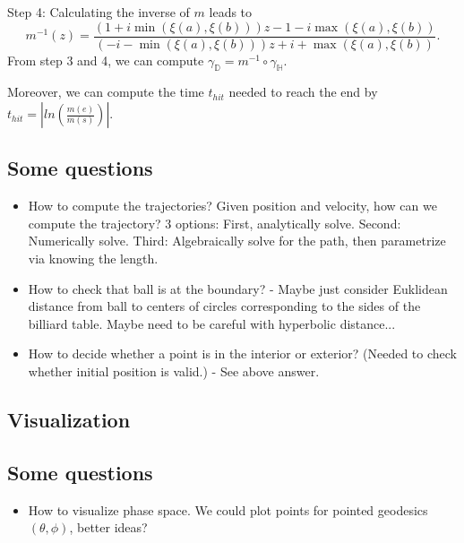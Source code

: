 \documentclass{article}
\begin{document}
Step 4: Calculating the inverse of $m$ leads to 
\begin{equation*}
	m^{-1}(z) = \frac{(1+i\min(\xi(a), \xi(b)))z -1- i \max(\xi(a), \xi(b))}{(-i-\min(\xi(a), \xi(b)))z + i + \max(\xi(a), \xi(b))}. 
\end{equation*}
From step 3 and 4, we can compute $\gamma_{\mathbb{D}} = m^{-1} \circ \gamma_{\mathbb{H}}$. 

Moreover, we can compute the time $t_{hit}$ needed to reach the end by $t_{hit} = |ln(\frac{m(e)}{m(s)})|$.

\subsection{Some questions}
\begin{itemize}
	
    \item How to compute the trajectories? Given position and velocity, how can we compute the trajectory? 3 options: First, analytically solve. Second: Numerically solve. Third: Algebraically solve for the path, then parametrize via knowing the length.
    
    \item How to check that ball is at the boundary? - Maybe just consider Euklidean distance from ball to centers of circles corresponding to the sides of the billiard table. Maybe need to be careful with hyperbolic distance...
    
    \item How to decide whether a point is in the interior or exterior? (Needed to check whether initial position is valid.) - See above answer. 

    
\end{itemize}

\subsection{Visualization}

\subsection{Some questions}
\begin{itemize}
	\item How to visualize phase space. We could plot points for pointed geodesics $(\theta,\phi)$, better ideas?
\end{itemize}
\end{document}
